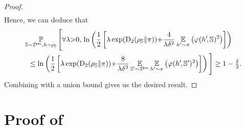 \begin{noaddcontents}
\begin{proof}
\begin{align*}
\end{align*}
Hence, we can deduce that
\begin{align}
    &\operatorname*{\mathbb{P}}_{\mathbb{S}\sim\mathcal{D}^{m},h\sim \rho_{\mathbb{S}}}\Bigg[\forall\lambda{>}0,\,\ln\left(\frac{1}{2}\left[\lambda\exp(\operatorname{D}_{2}( \rho_{\mathbb{S}}\|\pi)){+} \frac{4}{\lambda\delta^2}\operatorname*{\mathbb{E}}_{h'{\sim}\pi}\left(\varphi(h'\!, \mathbb{S})^2\right)\right]\right)\nonumber\\
    &\hspace{0.2cm}\le \ln\left(\frac{1}{2}\left[\lambda\exp(\operatorname{D}_{2}( \rho_{\mathbb{S}}\|\pi)){+}\frac{8}{\lambda\delta^3}\operatorname*{\mathbb{E}}_{\mathbb{S}'{\sim}\mathcal{D}^{m}}\operatorname*{\mathbb{E}}_{h'{\sim}\pi}\left(\varphi(h'\!, \mathbb{S}')^2\right)\right]\right) \Bigg]\ge 1-\tfrac{\delta}{2}.
    \label{chap:dis-pra:eq:disintegrated-param-proof-2}
\end{align}
Combining  with a union bound gives us the desired result.
\end{proof}

\section{Proof of }
\label{chap:dis-pra:sec:proof-min-lambda}


\end{noaddcontents}
